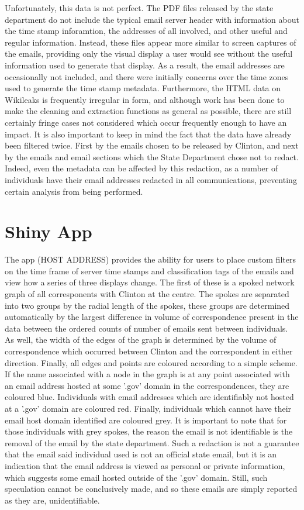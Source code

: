 \documentclass[journal]{vgtc}                %
\begin{document}
Unfortunately, this data is not perfect. The PDF files released by the state department do not include the typical email server header with information about the time stamp inforamtion, the addresses of all involved, and other useful and regular information. Instead, these files appear more similar to screen captures of the emails, providing only the visual display a user would see without the useful information used to generate that display. As a result, the email addresses are occasionally not included, and there were initially concerns over the time zones used to generate the time stamp metadata. Furthermore, the HTML data on Wikileaks is frequently irregular in form, and although work has been done to make the cleaning and extraction functions as general as possible, there are still certainly fringe cases not considered which occur frequently enough to have an impact. It is also important to keep in mind the fact that the data have already been filtered twice. First by the emails chosen to be released by Clinton, and next by the emails and email sections which the State Department chose not to redact. Indeed, even the metadata can be affected by this redaction, as a number of individuals have their email addresses redacted in all communications, preventing certain analysis from being performed.

\section{Shiny App}

The app (HOST ADDRESS) provides the ability for users to place custom filters on the time frame of server time stamps and classification tags of the emails and view how a series of three displays change. The first of these is a spoked network graph of all corresponents with Clinton at the centre. The spokes are separated into two groups by the radial length of the spokes, these groups are determined automatically by the largest difference in volume of correspondence present in the data between the ordered counts of number of emails sent between individuals. As well, the width of the edges of the graph is determined by the volume of correspondence which occurred between Clinton and the correspondent in either direction. Finally, all edges and points are coloured according to a simple scheme. If the name associated with a node in the graph is at any point associated with an email address hosted at some '.gov' domain in the correspondences, they are coloured blue. Individuals with email addresses which are identifiably not hosted at a '.gov' domain are coloured red. Finally, individuals which cannot have their email host domain identified are coloured grey. It is important to note that for those individuals with grey spokes, the reason the email is not identifiable is the removal of the email by the state department. Such a redaction is not a guarantee that the email said individual used is not an official state email, but it is an indication that the email address is viewed as personal or private information, which suggests some email hosted outside of the '.gov' domain. Still, such speculation cannot be conclusively made, and so these emails are simply reported as they are, unidentifiable.
\end{document}
